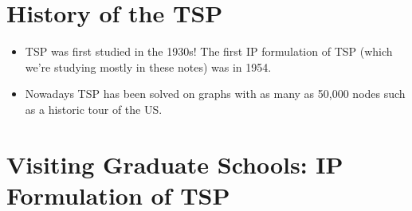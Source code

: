 \documentclass[11pt]{article}
\theoremstyle{definition}
\begin{document}
\newpage

\section{History of the TSP}

\begin{itemize}
\item TSP was first studied in the 1930s! The first IP formulation of TSP (which we're studying mostly in these notes) was in 1954.
\item Nowadays TSP has been solved on graphs with as many as 50,000 nodes such as a historic tour of the US.
\end{itemize}

\section{Visiting Graduate Schools: IP Formulation of TSP}
\end{document}

